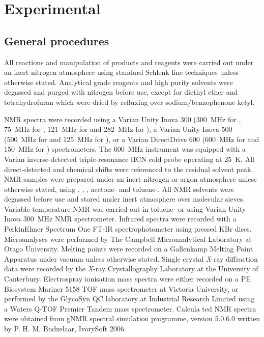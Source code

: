 
\chapter{Experimental}
\label{ch:expt}

\section{General procedures}
\label{section:generalprocedures}


All reactions and manipulation of products and reagents were carried out under an inert nitrogen atmosphere using standard Schlenk line techniques unless otherwise stated.  Analytical grade reagents and high purity solvents were degassed and purged with nitrogen before use, except for diethyl ether and tetrahydrofuran which were dried by refluxing over sodium/benzophenone ketyl.  

NMR spectra were recorded using a Varian Unity Inova 300 (300~MHz for \proton, 75~MHz for \carbon, 121~MHz for \phosphorus{} and 282~MHz for \fluorine), a Varian Unity Inova 500 (500~MHz for \proton{} and 125~MHz for \carbon), or a Varian DirectDrive 600 (600~MHz for \proton and 150~MHz for \carbon{}) spectrometers.   The 600~MHz instrument was equipped with a Varian inverse-detected triple-resonance HCN cold probe operating at 25~K.  All direct-detected \proton{} and \carbon{} chemical shifts were referenced to the residual solvent peak.\cite{Fulmer2010}  NMR samples were prepared under an inert nitrogen or argon atmosphere unless otherwise stated, using , , , acetone- and toluene-.  All NMR solvents were degassed before use and stored under inert atmosphere over molecular sieves.  Variable temperature NMR was carried out in toluene- or  using Varian Unity Inova 300~MHz NMR spectrometer.  Infrared spectra were recorded with a PerkinElmer Spectrum One FT-IR spectrophotometer using pressed KBr discs.  Microanalyses were performed by The Campbell Microanalytical Laboratory at Otago University.  Melting points were recorded on a Gallenkamp Melting Point Apparatus under vacuum unless otherwise stated. Single crystal \textit{X}-ray diffraction data were recorded by the \textit{X}-ray Crystallography Laboratory at the University of Canterbury.  Electrospray ionisation mass spectra were either recorded on a PE Biosystem Mariner 5158 TOF mass spectrometer at Victoria University, or performed by the GlycoSyn QC laboratory at Industrial Research Limited using a Waters Q-TOF Premier Tandem mass spectrometer.  Calcula ted \proton{} NMR spectra were obtained from gNMR spectral simulation programme, version 5.0.6.0 written by P. H. M. Budzelaar, IvorySoft 2006.

